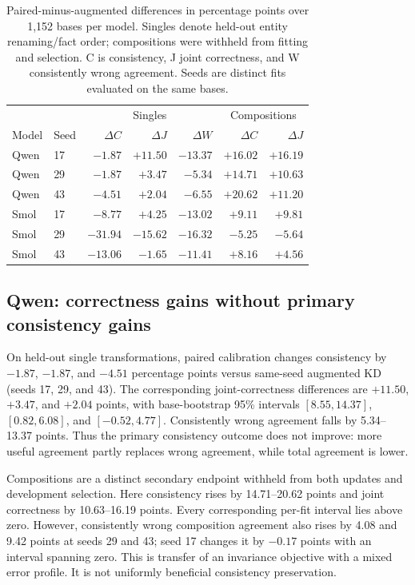 \documentclass[11pt]{article}
\begin{document}
\begin{table}[t]
\centering\small
\caption{Paired-minus-augmented differences in percentage points over 1,152
bases per model. Singles denote held-out entity renaming/fact order;
compositions were withheld from fitting and selection. C is consistency,
J joint correctness, and W consistently wrong agreement. Seeds are distinct
fits evaluated on the same bases.}
\label{tab:final-contrasts}
\begin{tabular}{llrrrrr}
\toprule
 & & \multicolumn{3}{c}{Singles} & \multicolumn{2}{c}{Compositions}\\
Model & Seed & $\Delta C$ & $\Delta J$ & $\Delta W$ & $\Delta C$ & $\Delta J$\\
\midrule
Qwen & 17 & $-1.87$ & $+11.50$ & $-13.37$ & $+16.02$ & $+16.19$\\
Qwen & 29 & $-1.87$ & $+3.47$ & $-5.34$ & $+14.71$ & $+10.63$\\
Qwen & 43 & $-4.51$ & $+2.04$ & $-6.55$ & $+20.62$ & $+11.20$\\
Smol & 17 & $-8.77$ & $+4.25$ & $-13.02$ & $+9.11$ & $+9.81$\\
Smol & 29 & $-31.94$ & $-15.62$ & $-16.32$ & $-5.25$ & $-5.64$\\
Smol & 43 & $-13.06$ & $-1.65$ & $-11.41$ & $+8.16$ & $+4.56$\\
\bottomrule
\end{tabular}
\end{table}

\subsection{Qwen: correctness gains without primary consistency gains}
On held-out single transformations, paired calibration changes consistency
by $-1.87$, $-1.87$, and $-4.51$ percentage points versus same-seed augmented
KD (seeds 17, 29, and 43). The corresponding joint-correctness differences
are $+11.50$, $+3.47$, and $+2.04$ points, with base-bootstrap 95\% intervals
$[8.55,14.37]$, $[0.82,6.08]$, and $[-0.52,4.77]$.
Consistently wrong agreement falls by 5.34--13.37 points. Thus the primary
consistency outcome does not improve: more useful agreement partly replaces
wrong agreement, while total agreement is lower.

Compositions are a distinct secondary endpoint withheld from both updates
and development selection. Here consistency rises by 14.71--20.62 points
and joint correctness by 10.63--16.19 points. Every corresponding
per-fit interval lies above zero. However, consistently wrong composition
agreement also rises by 4.08 and 9.42 points at seeds 29 and 43; seed 17
changes it by $-0.17$ points with an interval spanning zero.
This is transfer of an invariance objective with a mixed error profile.
It is not uniformly beneficial consistency preservation.
\end{document}
